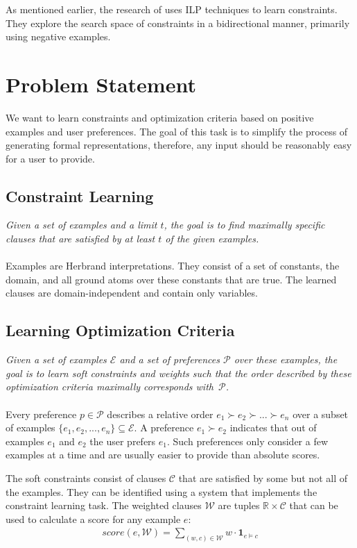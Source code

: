 \documentclass[letterpaper]{article}
\newcommand{\sym}[1]{\ensuremath{\mathcal{#1}}}
\theoremstyle{definition}
\begin{document}
As mentioned earlier, the research of \cite{Lallouet:LearningCP} uses ILP techniques to learn constraints.
They explore the search space of constraints in a bidirectional manner, primarily using negative examples.


\section{Problem Statement}
\label{sec:problem}
We want to learn constraints and optimization criteria based on positive examples and user preferences.
The goal of this task is to simplify the process of generating formal representations, therefore, any input should be reasonably easy for a user to provide.

\subsection{Constraint Learning}
\emph{Given a set of examples and a limit $t$, the goal is to find maximally specific clauses that are satisfied by at least $t$ of the given examples.}
\\\\
Examples are Herbrand interpretations.
They consist of a set of constants, the domain, and all ground atoms over these constants that are true.
The learned clauses are domain-independent and contain only variables.

\subsection{Learning Optimization Criteria}
\emph{Given a set of examples \sym{E} and a set of preferences \sym{P} over these examples, the goal is to learn soft constraints and weights such that the order described by these optimization criteria maximally corresponds with~\sym{P}.}
\\\\
Every preference $p \in \sym{P}$ describes a relative order $e_1 \succ e_2 \succ ... \succ e_n$ over a subset of examples $\{e_1, e_2, ..., e_n\} \subseteq \sym{E}$.
A preference $e_1 \succ e_2$ indicates that out of examples $e_1$ and $e_2$ the user prefers $e_1$.
Such preferences only consider a few examples at a time and are usually easier to provide than absolute scores.

The soft constraints consist of clauses \sym{C} that are satisfied by some but not all of the examples.
They can be identified using a system that implements the constraint learning task.
The weighted clauses \sym{W} are tuples $\mathbb{R} \times \sym{C}$ that can be used to calculate a score for any example $e$:
\begin{eqnarray}
  \label{eqn:score}
  score(e, \sym{W}) = \sum\limits_{(\mathit{w}, \mathit{c}) \in \sym{W}} \mathit{w} \cdot \mathbf{1}_{e \models c}
\end{eqnarray}
\end{document}
